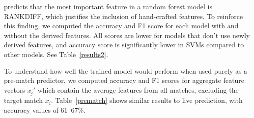  predicts that the most important feature in a random forest model is  RANKDIFF, which justifies the inclusion of hand-crafted features. To reinforce this finding, we computed the accuracy and F1 score for each model with and without the derived features. All scores are lower for models that don't use newly derived features, and accuracy score is significantly lower in SVMs compared to other models. See Table~\ref{results2}.



To understand how well the trained model would perform when used purely as a pre-match predictor, we computed accuracy and F1 scores for aggregate feature vectors $\underline{x_i'}$ which contain the average features from all matches, excluding the target match $x_i$. Table~\ref{prematch} shows similar results to live prediction, with accuracy values of 61--67\%.
\begin{table}[t]
\caption{Pre-match prediction model performance}
\label{prematch}
\centering
\setlength{\tabcolsep}{10pt}
\end{table}